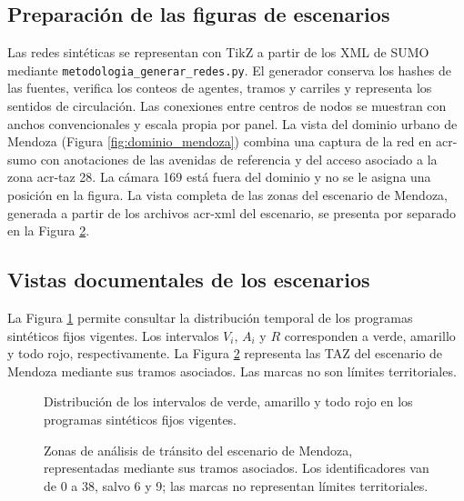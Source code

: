 \subsection{Preparación de las figuras de escenarios}

Las redes sintéticas se representan con TikZ a partir de los XML de SUMO mediante \texttt{metodologia\_generar\_redes.py}. El generador conserva los hashes de las fuentes, verifica los conteos de agentes, tramos y carriles y representa los sentidos de circulación. Las conexiones entre centros de nodos se muestran con anchos convencionales y escala propia por panel. La vista del dominio urbano de Mendoza (Figura \ref{fig:dominio_mendoza}) combina una captura de la red en \acrshort{acr-sumo} con anotaciones de las avenidas de referencia y del acceso asociado a la zona \acrshort{acr-taz} 28. La cámara 169 está fuera del dominio y no se le asigna una posición en la figura. La vista completa de las zonas del escenario de Mendoza, generada a partir de los archivos \acrshort{acr-xml} del escenario, se presenta por separado en la Figura \ref{fig:mendoza_taz}.

\subsection{Vistas documentales de los escenarios}

La Figura \ref{fig:tiempos_semaforicos_base} permite consultar la distribución temporal de los programas sintéticos fijos vigentes. Los intervalos $V_i$, $A_i$ y $R$ corresponden a verde, amarillo y todo rojo, respectivamente. La Figura \ref{fig:mendoza_taz} representa las TAZ del escenario de Mendoza mediante sus tramos asociados. Las marcas no son límites territoriales.

\begin{figure}[H]
\centering

\caption{Distribución de los intervalos de verde, amarillo y todo rojo en los programas sintéticos fijos vigentes.}
\label{fig:tiempos_semaforicos_base}
\end{figure}

\begin{figure}[H]
\centering

\caption{Zonas de análisis de tránsito del escenario de Mendoza, representadas mediante sus tramos asociados. Los identificadores van de 0 a 38, salvo 6 y 9; las marcas no representan límites territoriales.}
\label{fig:mendoza_taz}
\end{figure}


